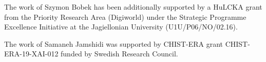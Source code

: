 \documentclass[
 twocolumn,
 hf,
]{ceurart}
\begin{document}

\begin{acknowledgments}
The work of Szymon Bobek has been additionally supported by a HuLCKA grant from the Priority Research Area (Digiworld) under the Strategic Programme Excellence Initiative at the Jagiellonian University (U1U/P06/NO/02.16).

The work of Samaneh Jamshidi was supported by CHIST-ERA grant CHIST-ERA-19-XAI-012 funded by Swedish Research Council.
\end{acknowledgments}


\end{document}
